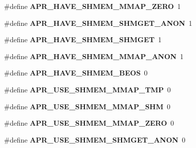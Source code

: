 \begin{DoxyCompactItemize}
\item 
\#define {\bfseries A\+P\+R\+\_\+\+H\+A\+V\+E\+\_\+\+S\+H\+M\+E\+M\+\_\+\+M\+M\+A\+P\+\_\+\+Z\+E\+RO}~1\hypertarget{group__apr__platform_gae77c5864ac1e978b5cdc4613efe874b9}{}\label{group__apr__platform_gae77c5864ac1e978b5cdc4613efe874b9}

\item 
\#define {\bfseries A\+P\+R\+\_\+\+H\+A\+V\+E\+\_\+\+S\+H\+M\+E\+M\+\_\+\+S\+H\+M\+G\+E\+T\+\_\+\+A\+N\+ON}~1\hypertarget{group__apr__platform_ga3c0e8fc59b8891eeacac290bca9df09b}{}\label{group__apr__platform_ga3c0e8fc59b8891eeacac290bca9df09b}

\item 
\#define {\bfseries A\+P\+R\+\_\+\+H\+A\+V\+E\+\_\+\+S\+H\+M\+E\+M\+\_\+\+S\+H\+M\+G\+ET}~1\hypertarget{group__apr__platform_ga35d1fadddb8c1e83a5548946d169da2a}{}\label{group__apr__platform_ga35d1fadddb8c1e83a5548946d169da2a}

\item 
\#define {\bfseries A\+P\+R\+\_\+\+H\+A\+V\+E\+\_\+\+S\+H\+M\+E\+M\+\_\+\+M\+M\+A\+P\+\_\+\+A\+N\+ON}~1\hypertarget{group__apr__platform_ga8237055d9f5700fdccfd173da26ff614}{}\label{group__apr__platform_ga8237055d9f5700fdccfd173da26ff614}

\item 
\#define {\bfseries A\+P\+R\+\_\+\+H\+A\+V\+E\+\_\+\+S\+H\+M\+E\+M\+\_\+\+B\+E\+OS}~0\hypertarget{group__apr__platform_ga158aa4bb703689e01adced53d16ae503}{}\label{group__apr__platform_ga158aa4bb703689e01adced53d16ae503}

\item 
\#define {\bfseries A\+P\+R\+\_\+\+U\+S\+E\+\_\+\+S\+H\+M\+E\+M\+\_\+\+M\+M\+A\+P\+\_\+\+T\+MP}~0\hypertarget{group__apr__platform_ga165e27e6100d65b6893d1c9b7e808536}{}\label{group__apr__platform_ga165e27e6100d65b6893d1c9b7e808536}

\item 
\#define {\bfseries A\+P\+R\+\_\+\+U\+S\+E\+\_\+\+S\+H\+M\+E\+M\+\_\+\+M\+M\+A\+P\+\_\+\+S\+HM}~0\hypertarget{group__apr__platform_ga38ed6a0607f8fbbe977843d84c42b02a}{}\label{group__apr__platform_ga38ed6a0607f8fbbe977843d84c42b02a}

\item 
\#define {\bfseries A\+P\+R\+\_\+\+U\+S\+E\+\_\+\+S\+H\+M\+E\+M\+\_\+\+M\+M\+A\+P\+\_\+\+Z\+E\+RO}~0\hypertarget{group__apr__platform_gad75204199cfa3631263fb1f1ea8abc94}{}\label{group__apr__platform_gad75204199cfa3631263fb1f1ea8abc94}

\item 
\#define {\bfseries A\+P\+R\+\_\+\+U\+S\+E\+\_\+\+S\+H\+M\+E\+M\+\_\+\+S\+H\+M\+G\+E\+T\+\_\+\+A\+N\+ON}~0\hypertarget{group__apr__platform_gaeaedd6e1272ded14f16701b96a3ad14c}{}\label{group__apr__platform_gaeaedd6e1272ded14f16701b96a3ad14c}


\end{DoxyCompactItemize}
